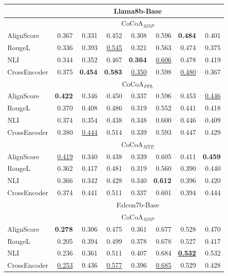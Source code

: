 \begin{table*}[th!]
\begin{tabular}{lrrrrrrr}
\rowcolor[gray]{0.9} & \multicolumn{7}{c}{Llama8b-Base} \\

\midrule

& \multicolumn{7}{c}{$\text{CoCoA}_{MSP}$}\\
\midrule

AlignScore & 0.367& 0.331& 0.452& 0.308& 0.596& \textbf{0.484}& 0.401\\
RougeL & 0.336& 0.393& \underline{0.545}& 0.321& 0.563& 0.474& 0.375\\
NLI & 0.344& 0.352& 0.467& \textbf{0.364}& \underline{0.606}& 0.478& 0.419\\
CrossEncoder & 0.375& \textbf{0.454}& \textbf{0.583}& \underline{0.350}& 0.598& \underline{0.480}& 0.367\\

\midrule

& \multicolumn{7}{c}{$\text{CoCoA}_{PPL}$}\\
\midrule

AlignScore & \textbf{0.422}& 0.346& 0.450& 0.337& 0.596& 0.453& \underline{0.446}\\
RougeL & 0.370& 0.408& 0.486& 0.319& 0.552& 0.441& 0.418\\
NLI & 0.374& 0.354& 0.438& 0.348& 0.600& 0.446& 0.409\\
CrossEncoder & 0.380& \underline{0.444}& 0.514& 0.339& 0.593& 0.447& 0.429\\

\midrule

& \multicolumn{7}{c}{$\text{CoCoA}_{MTE}$}\\
\midrule

AlignScore & \underline{0.419}& 0.340& 0.438& 0.339& 0.605& 0.411& \textbf{0.459}\\
RougeL & 0.362& 0.417& 0.481& 0.319& 0.560& 0.390& 0.440\\
NLI & 0.366& 0.342& 0.428& 0.340& \textbf{0.612}& 0.396& 0.420\\
CrossEncoder & 0.374& 0.441& 0.511& 0.337& 0.601& 0.394& 0.444\\
\midrule

\rowcolor[gray]{0.9} & \multicolumn{7}{c}{Falcon7b-Base} \\

\midrule

& \multicolumn{7}{c}{$\text{CoCoA}_{MSP}$}\\
\midrule

AlignScore & \textbf{0.278}& 0.306& 0.475& 0.361& 0.677& 0.528& 0.470\\
RougeL & 0.205& 0.394& 0.499& 0.378& 0.678& 0.527& 0.417\\
NLI & 0.236& 0.361& 0.511& 0.407& 0.684& \textbf{\underline{0.532}}& 0.532\\
CrossEncoder & \underline{0.253}& 0.436& \underline{0.577}& 0.396& \underline{0.685}& 0.529& 0.428\\


\end{tabular}
\end{table*}
